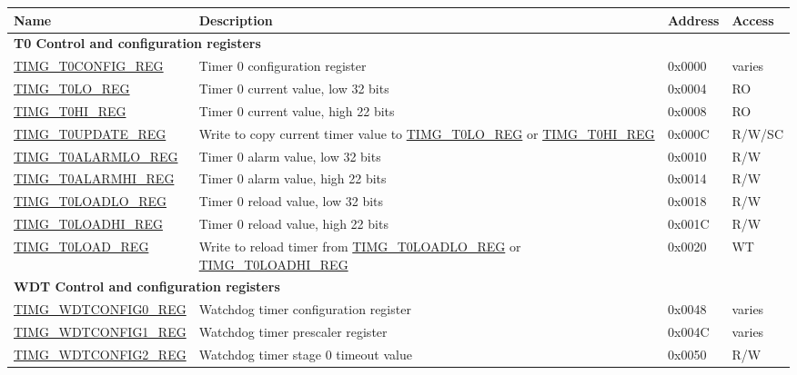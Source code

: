 
\begin{longtable}{ | p{5.5cm} | p{7.5cm} | p{1.3cm} | p{1cm} | }
    \hline\rowcolor{lightgray}
    Name & Description &  Address & Access \\ \hline
    \endhead
    \multicolumn{4}{|l|}{\textbf{T0 Control and configuration registers}} \\ \hline
    \hyperref[regdesc:TIMGTXCONFIGREG]{TIMG\_T0CONFIG\_REG} & Timer 0 configuration register & 0x0000 & varies \\ \hline
    \hyperref[regdesc:TIMGTXLOREG]{TIMG\_T0LO\_REG} & Timer 0 current value, low 32 bits & 0x0004 & RO \\ \hline
    \hyperref[regdesc:TIMGTXHIREG]{TIMG\_T0HI\_REG} & Timer 0 current value, high 22 bits & 0x0008 & RO \\ \hline
    \hyperref[regdesc:TIMGTXUPDATEREG]{TIMG\_T0UPDATE\_REG} & Write to copy current timer value to \hyperref[regdesc:TIMGTXLOREG]{TIMG\_T0LO\_REG} or \hyperref[regdesc:TIMGTXHIREG]{TIMG\_T0HI\_REG} & 0x000C & R/W/SC \\ \hline
    \hyperref[regdesc:TIMGTXALARMLOREG]{TIMG\_T0ALARMLO\_REG} & Timer 0 alarm value, low 32 bits & 0x0010 & R/W \\ \hline
    \hyperref[regdesc:TIMGTXALARMHIREG]{TIMG\_T0ALARMHI\_REG} & Timer 0 alarm value, high 22 bits & 0x0014 & R/W \\ \hline
    \hyperref[regdesc:TIMGTXLOADLOREG]{TIMG\_T0LOADLO\_REG} & Timer 0 reload value, low 32 bits & 0x0018 & R/W \\ \hline
    \hyperref[regdesc:TIMGTXLOADHIREG]{TIMG\_T0LOADHI\_REG} & Timer 0 reload value, high 22 bits & 0x001C & R/W \\ \hline
    \hyperref[regdesc:TIMGTXLOADREG]{TIMG\_T0LOAD\_REG} & Write to reload timer from \hyperref[regdesc:TIMGTXLOADLOREG]{TIMG\_T0LOADLO\_REG} or \hyperref[regdesc:TIMGTXLOADHIREG]{TIMG\_T0LOADHI\_REG} & 0x0020 & WT \\ \hline
    \multicolumn{4}{|l|}{\textbf{WDT Control and configuration registers}} \\ \hline
    \hyperref[regdesc:TIMGWDTCONFIG0REG]{TIMG\_WDTCONFIG0\_REG} & Watchdog timer configuration register & 0x0048 & varies \\ \hline
    \hyperref[regdesc:TIMGWDTCONFIG1REG]{TIMG\_WDTCONFIG1\_REG} & Watchdog timer prescaler register & 0x004C & varies \\ \hline
    \hyperref[regdesc:TIMGWDTCONFIG2REG]{TIMG\_WDTCONFIG2\_REG} & Watchdog timer stage 0 timeout value & 0x0050 & R/W \\ \hline

\end{longtable}
